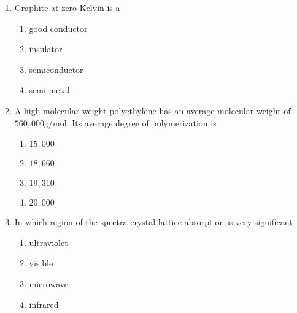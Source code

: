 \documentclass[journal,12pt,onecolumn]{IEEEtran}
\theoremstyle{remark}
\begin{document}
\begin{enumerate}
\item Graphite at zero Kelvin is a

\begin{enumerate}
	\item good conductor
	\item insulator
	\item semiconductor
	\item semi-metal
\end{enumerate}

\item A high molecular weight polyethylene has an average molecular weight of $560,000$g/mol. Its average degree of polymerization is

\begin{enumerate}
	\item $15,000$
	\item $18,660$
	\item $19,310$
	\item $20,000$
\end{enumerate}

\item In which region of the spectra crystal lattice absorption is very significant

\begin{enumerate}
	\item ultraviolet
	\item visible
	\item microwave
	\item infrared
\end{enumerate}

\end{enumerate}
\end{document}

